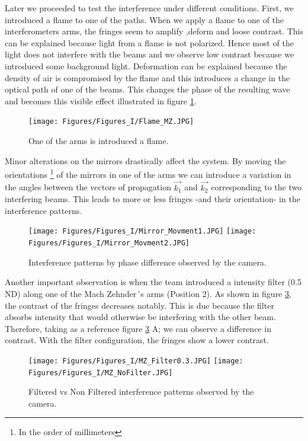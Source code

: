 Later we proceeded to test the interference under different conditions. First, we introduced a flame to one of the paths. When we apply a flame to one of the interferometers arms, the fringes seem to amplify ,deform and loose contrast. This can be explained because light from a flame is not polarized. Hence most of the light does not interfere with the beams and we observe low contrast because we introduced some background light. Deformation can be explained because the density of air is compromised by the flame and this introduces a change in the optical path of one of the beams. This changes the phase of the resulting wave and becomes this visible effect illustrated in figure \ref{fig:FlameMZ}.  

\begin{figure}[H]
    \centering
    \texttt{[image: Figures/Figures\_I/Flame\_MZ.JPG]}
    \label{fig:FlameMZ}
    \caption{One of the arms is introduced a flame.}
\end{figure}

Minor alterations on the mirrors drastically affect the system. By moving the orientations \footnote{In the order of millimeters} of the mirrors in one of the arms we can introduce a variation in the angles between the vectors of propagation $\vec{k_1} $ and $\vec{k_2}$ corresponding to the two interfering beams. This leads to more or less fringes -and their orientation- in the interference patterns. 

\begin{figure} [H]
    \texttt{[image: Figures/Figures\_I/Mirror\_Movment1.JPG]}\hfill
    \texttt{[image: Figures/Figures\_I/Mirror\_Movment2.JPG]}\hfill
    \caption{Interference patterns by phase difference observed by the camera.}
    \label{fig:kvectors}
\end{figure}

Another important observation is when the team introduced a intensity filter (0.5 ND) along one of the Mach Zehnder´s arms (Position 2). As shown in figure \ref{fig:filters}, the contrast of the fringes decreases notably.  This is due because the filter absorbs intensity that would otherwise be interfering with the other beam. Therefore, taking as a reference figure \ref{fig:filters} A; we can observe a difference in contrast. With the filter configuration, the fringes show a lower contrast. 

\begin{figure} [H]
    \texttt{[image: Figures/Figures\_I/MZ\_Filter0.3.JPG]}\hfill
    \texttt{[image: Figures/Figures\_I/MZ\_NoFilter.JPG]}\hfill
    \caption{Filtered vs Non Filtered interference patterns observed by the camera.}
    \label{fig:filters}
\end{figure}

